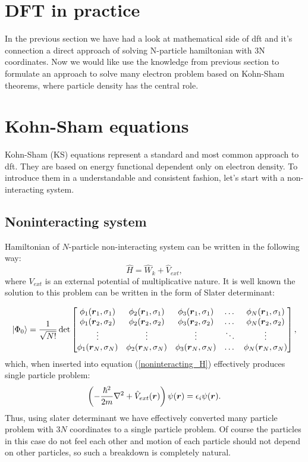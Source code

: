 \documentclass[openany, longbibliography,slovene,a4paper,12pt]{article}
\def\vec#1{\mbox{\boldmath$#1$}}
\begin{document}
  \section{DFT in practice}
  In the previous section we have had a look at mathematical side of dft and
  it's connection a direct approach of solving N-particle hamiltonian with
  3N coordinates. Now we would like use the knowledge from previous section to
  formulate an approach to solve many electron problem based on Kohn-Sham
  theorems, where particle density has the central role.
  
  \section{Kohn-Sham equations}
  Kohn-Sham (KS) equations represent a standard and most common approach to dft.
  They are based on energy functional dependent only on electron density. To
  introduce them in a understandable and consistent fashion, let's start with a
  non-interacting system. 
 
\subsection{Noninteracting system}
Hamiltonian of $N$-particle non-interacting system can be written in the
following way:
 \begin{equation} \label{noninteracting_H}
   \hat H =\hat  W_k + \hat V_{ext}, 
 \end{equation}
 where $V_{ext}$ is an external potential of multiplicative nature. It is well
 known the solution to this problem can be written in the form of Slater determinant:

 \[
       \ket{\Phi_0} = \frac{1}{\sqrt{N!}}\det 
   \begin{bmatrix}
   \phi_{1}(\vec r_1, \sigma_1) & \phi_{2}(\vec r_1, \sigma_1) & \phi_{3}(\vec
   r_1, \sigma_1) & \dots & \phi_{N}(\vec r_1, \sigma_1) \\
    \phi_{1}(\vec r_2, \sigma_2) & \phi_{2}(\vec r_2, \sigma_2) & \phi_{3}(\vec
    r_2, \sigma_2) & \dots & \phi_{N}(\vec r_2, \sigma_2) \\
    \vdots & \vdots & \vdots & \ddots & \vdots \\
     \phi_{1}(\vec r_N, \sigma_N) & \phi_{2}(\vec r_N, \sigma_N) & \phi_{3}(\vec r_N, \sigma_N) & \dots & \phi_{N}(\vec r_N, \sigma_N) \\
\end{bmatrix},
\]
 which, when inserted into equation (\ref{noninteracting_H}) effectively produces
 single particle problem:
 \begin{equation}
   \left(-\frac{\hbar^2}{2m}\nabla^2 + \hat V_{ext}(\vec r)\right) \psi (\vec r) = \epsilon_i \psi(\vec r).
 \end{equation}
 Thus, using slater determinant we have effectively converted many particle
 problem with $3N$ coordinates to a single particle problem. Of course the
 particles in this case do not feel each other and motion of each particle
 should not depend on other particles, so such a breakdown is completely natural.
 
\end{document}
